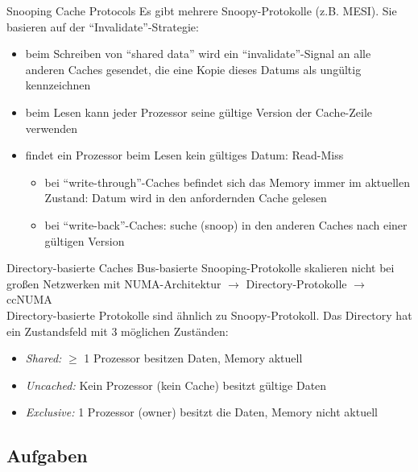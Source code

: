 \begin{defi}{Snooping Cache Protocols}
    Es gibt mehrere Snoopy-Protokolle (z.B. MESI).
    Sie basieren auf der \enquote{Invalidate}-Strategie:
    \begin{itemize}
        \item beim Schreiben von \enquote{shared data} wird ein \enquote{invalidate}-Signal an alle anderen Caches gesendet,
              die eine Kopie dieses Datums als ungültig kennzeichnen
        \item beim Lesen kann jeder Prozessor seine gültige Version der Cache-Zeile verwenden
        \item findet ein Prozessor beim Lesen kein gültiges Datum: Read-Miss
              \begin{itemize}
                  \item bei \enquote{write-through}-Caches befindet sich das Memory immer im aktuellen Zustand:
                        Datum wird in den anfordernden Cache gelesen
                  \item bei \enquote{write-back}-Caches:
                        suche (snoop) in den anderen Caches nach einer gültigen Version
              \end{itemize}
    \end{itemize}
\end{defi}

\begin{defi}{Directory-basierte Caches}
    Bus-basierte Snooping-Protokolle skalieren nicht bei großen Netzwerken mit NUMA-Architektur
    $\to$ Directory-Protokolle $\to$ ccNUMA \\
    Directory-basierte Protokolle sind ähnlich zu Snoopy-Protokoll.
    Das Directory hat ein Zustandsfeld mit 3 möglichen Zuständen:
    \begin{itemize}
        \item \emph{Shared:}     $\geq$ 1 Prozessor besitzen Daten, Memory aktuell
        \item \emph{Uncached:}   Kein Prozessor (kein Cache) besitzt gültige Daten
        \item \emph{Exclusive:}  1 Prozessor (owner) besitzt die Daten, Memory nicht aktuell
    \end{itemize}
\end{defi}

\subsection{Aufgaben}

